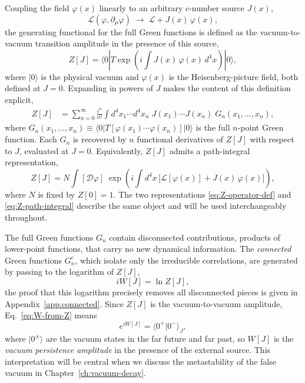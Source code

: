 Coupling the field $\varphi(x)$ linearly to an arbitrary $c$-number source $J(x)$,
\begin{equation}
    \mathcal{L}(\varphi,\partial_\mu\varphi)
    \;\longrightarrow\;
    \mathcal{L} + J(x)\,\varphi(x),
    \label{eq:source-coupling}
\end{equation}
the generating functional for the full Green functions is defined as the
vacuum-to-vacuum transition amplitude in the presence of this source,
\begin{equation}
    Z[J] = \langle 0 | T \exp\!\left( i \int J(x)\, \varphi(x)\, d^4x \right) | 0 \rangle,
    \label{eq:Z-operator-def}
\end{equation}
where $|0\rangle$ is the physical vacuum and $\varphi(x)$ is the Heisenberg-picture
field, both defined at $J=0$. Expanding in powers of $J$ makes the content of
this definition explicit,
\begin{align}
    Z[J] &= \sum_{n=0}^{\infty} \frac{i^n}{n!}
             \int d^4x_1 \cdots d^4x_n\;
             J(x_1) \cdots J(x_n)\;
             G_n(x_1, \ldots, x_n),
    \label{eq:Z-power-series}
\end{align}
where $G_n(x_1,\ldots,x_n) \equiv \langle 0|T[\varphi(x_1)\cdots\varphi(x_n)]|0\rangle$
is the full $n$-point Green function. Each $G_n$ is recovered by $n$ functional
derivatives of $Z[J]$ with respect to $J$, evaluated at $J=0$. Equivalently,
$Z[J]$ admits a path-integral representation,
\begin{equation}
    Z[J] = N \int [\mathcal{D}\varphi]\;
           \exp\!\left( i \int d^4x\,
           \bigl[\mathcal{L}[\varphi(x)] + J(x)\,\varphi(x)\bigr] \right),
    \label{eq:Z-path-integral}
\end{equation}
where $N$ is fixed by $Z[0]=1$. The two representations
\eqref{eq:Z-operator-def} and \eqref{eq:Z-path-integral} describe the same
object and will be used interchangeably throughout.

The full Green functions $G_n$ contain disconnected contributions, products
of lower-point functions, that carry no new dynamical information. The
\emph{connected} Green functions $G_n^c$, which isolate only the irreducible
correlations, are generated by passing to the logarithm of $Z[J]$,
\begin{equation}
    iW[J] = \ln Z[J],
    \label{eq:W-from-Z}
\end{equation}
the proof that this logarithm precisely removes all disconnected pieces is
given in Appendix~\ref{app:connected}. Since $Z[J]$ is the vacuum-to-vacuum
amplitude, Eq.~\eqref{eq:W-from-Z} means
\begin{equation}
    e^{iW[J]} = \langle 0^+|0^-\rangle_J,
    \label{eq:W-vacuum-persistence}
\end{equation}
where $|0^\pm\rangle$ are the vacuum states in the far future and far past, so
$W[J]$ is the \emph{vacuum persistence amplitude} in the presence of the
external source. This interpretation will be central when we discuss the
metastability of the false vacuum in Chapter~\ref{ch:vacuum-decay}.


